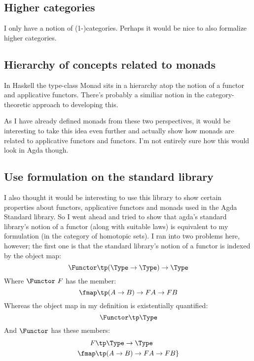 \subsection{Higher categories}
I only have a notion of (1-)categories. Perhaps it would be nice to also
formalize higher categories.

\subsection{Hierarchy of concepts related to monads}
In Haskell the type-class Monad sits in a hierarchy atop the notion of a functor
and applicative functors. There's probably a similiar notion in the
category-theoretic approach to developing this.

As I have already defined monads from these two perspectives, it would be
interesting to take this idea even further and actually show how monads are
related to applicative functors and functors. I'm not entirely sure how this
would look in Agda though.

\subsection{Use formulation on the standard library}
I also thought it would be interesting to use this library to show certain
properties about functors, applicative functors and monads used in the Agda
Standard library. So I went ahead and tried to show that agda's standard
library's notion of a functor (along with suitable laws) is equivalent to my
formulation (in the category of homotopic sets). I ran into two problems here,
however; the first one is that the standard library's notion of a functor is
indexed by the object map:
%
$$
\Functor \tp (\Type \to \Type) \to \Type
$$
%
Where $\Functor\ F$ has the member:
%
$$
\fmap \tp (A \to B) \to F A \to F B
$$
%
Whereas the object map in my definition is existentially quantified:
%
$$
\Functor \tp \Type
$$
%
And $\Functor$ has these members:
\begin{align*}
F     & \tp \Type \to \Type \\
\fmap & \tp (A \to B) \to F A \to F B\}
\end{align*}
%
